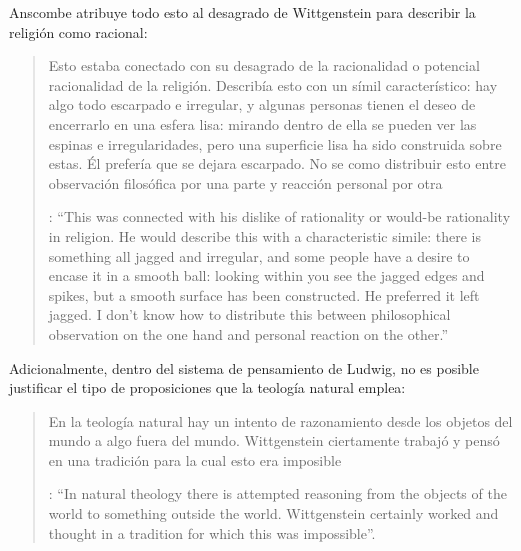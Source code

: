 Anscombe atribuye todo esto al desagrado de Wittgenstein para describir la religión como racional: \blockquote[{\Cite[122]{anscombe1981parmenides:qli}}: \enquote{This was connected with his dislike of rationality or would-be rationality in religion. He would describe this with a characteristic simile: there is something all jagged and irregular, and some people have a desire to encase it in a smooth ball: looking within you see the jagged edges and spikes, but a smooth surface has been constructed. He preferred it left jagged. I don't know how to distribute this between philosophical observation on the one hand and personal reaction on the other.}]{Esto estaba conectado con su desagrado de la racionalidad o potencial racionalidad de la religión. Describía esto con un símil característico: hay algo todo escarpado e irregular, y algunas personas tienen el deseo de encerrarlo en una esfera lisa: mirando dentro de ella se pueden ver las espinas e irregularidades, pero una superficie lisa ha sido construida sobre estas. Él prefería que se dejara escarpado. No se como distribuir esto entre observación filosófica por una parte y reacción personal por otra}. Adicionalmente, dentro del sistema de pensamiento de Ludwig, no es posible justificar el tipo de proposiciones que la teología natural emplea: \blockquote[{\Cite[123]{anscombe1981parmenides:qli}}: \enquote{In natural theology there is attempted reasoning from the objects of the world to something outside the world. Wittgenstein certainly worked and thought in a tradition for which this was impossible}.]{En la teología natural hay un intento de razonamiento desde los objetos del mundo a algo fuera del mundo. Wittgenstein ciertamente trabajó y pensó en una tradición para la cual esto era imposible}.

